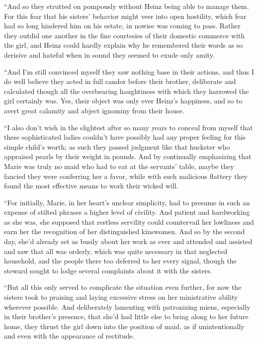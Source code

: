 \documentclass[12pt,a4paper]{article}
\begin{document}
“And so they strutted on pompously without Heinz being able to manage them. For this fear that his sisters’ behavior might veer into open hostility, which fear had so long hindered him on his estate, in nowise was coming to pass. Rather they outdid one another in the fine courtesies of their domestic commerce with the girl, and Heinz could hardly explain why he remembered their words as so derisive and hateful when in sound they seemed to exude only amity.

“And I’m still convinced myself they saw nothing base in their actions, and thus I do well believe they acted in full candor before their brother, deliberate and calculated though all the overbearing haughtiness with which they harrowed the girl certainly was. Yes, their object was only ever Heinz’s happiness, and so to avert great calamity and abject ignominy from their house.

“I also don’t wish in the slightest after so many years to conceal from myself that these sophisticated ladies couldn’t have possibly had any proper feeling for this simple child’s worth; as such they passed judgment like that huckster who appraised pearls by their weight in pounds. And by continually emphasizing that Marie was truly no maid who had to eat at the servants’ table, maybe they fancied they were conferring her a favor, while with such malicious flattery they found the most effective means to work their wicked will.

“For initially, Marie, in her heart’s unclear simplicity, had to presume in such an expense of stilted phrases a higher level of civility. And patient and hardworking as she was, she supposed that restless servility could countervail her lowliness and earn her the recognition of her distinguished kinswomen. And so by the second day, she’d already set as busily about her work as ever and attended and assisted and saw that all was orderly, which was quite necessary in that neglected household, and the people there too deferred to her every signal, though the steward sought to lodge several complaints about it with the sisters.

“But all this only served to complicate the situation even further, for now the sisters took to praising and laying excessive stress on her ministrative ability wherever possible. And deliberately lamenting with patronizing miens, especially in their brother’s presence, that she’d had little else to bring along to her future home, they thrust the girl down into the position of maid, as if unintentionally and even with the appearance of rectitude.
\end{document}
